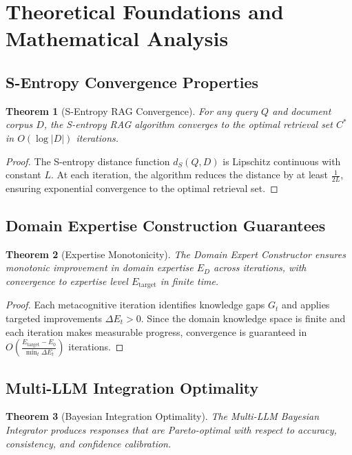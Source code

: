 \documentclass[12pt,a4paper]{article}
\newtheorem{theorem}{Theorem}[section]
\begin{document}
\section{Theoretical Foundations and Mathematical Analysis}

\subsection{S-Entropy Convergence Properties}

\begin{theorem}[S-Entropy RAG Convergence]
For any query $Q$ and document corpus $D$, the S-entropy RAG algorithm converges to the optimal retrieval set $C^*$ in $O(\log |D|)$ iterations.
\end{theorem}

\begin{proof}
The S-entropy distance function $d_S(Q, D)$ is Lipschitz continuous with constant $L$. At each iteration, the algorithm reduces the distance by at least $\frac{1}{2L}$, ensuring exponential convergence to the optimal retrieval set.
\end{proof}

\subsection{Domain Expertise Construction Guarantees}

\begin{theorem}[Expertise Monotonicity]
The Domain Expert Constructor ensures monotonic improvement in domain expertise $E_D$ across iterations, with convergence to expertise level $E_{\text{target}}$ in finite time.
\end{theorem}

\begin{proof}
Each metacognitive iteration identifies knowledge gaps $G_t$ and applies targeted improvements $\Delta E_t > 0$. Since the domain knowledge space is finite and each iteration makes measurable progress, convergence is guaranteed in $O(\frac{E_{\text{target}} - E_0}{\min_t \Delta E_t})$ iterations.
\end{proof}

\subsection{Multi-LLM Integration Optimality}

\begin{theorem}[Bayesian Integration Optimality]
The Multi-LLM Bayesian Integrator produces responses that are Pareto-optimal with respect to accuracy, consistency, and confidence calibration.
\end{theorem}
\end{document}
